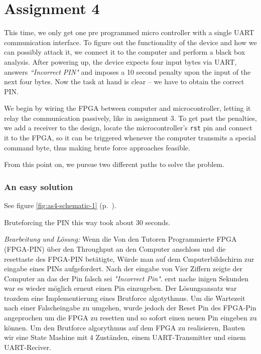 \section*{Assignment 4}


This time, we only get one pre programmed micro controller with a single UART communication interface. 
To figure out the functionality of the device and how we can possibly attack it, we connect it to the computer and perform a black box analysis.
After powering up, the device expects four input bytes via UART, answers \textit{``Incorrect PIN"} and imposes a 10 second penalty upon the input of the next four bytes. Now the task at hand is clear -- we have to obtain the correct PIN.

We begin by wiring the FPGA between computer and microcontroller, letting it relay the communication passively, like in assignment 3.
To get past the penalties, we add a receiver to the design, locate the microcontroller's \texttt{rst} pin and connect it to the FPGA, so it can be triggered whenever the computer transmits a special command byte, thus making brute force approaches feasible.

From this point on, we pursue two different paths to solve the problem.

\subsubsection*{An easy solution}
See figure \ref{fig:as4-schematic-1} (p.~\pageref{fig:as4-schematic-1}).

Bruteforcing the PIN this way took about 30 seconds.



\emph{Bearbeitung und Lösung: }Wenn die Von den Tutoren Programmierte FPGA (FPGA-PIN) über den Throughput an den Computer anschloss und die resettaste des FPGA-PIN betätigte, Würde man auf dem Cmputerbildschirm zur eingabe eines PINs aufgefordert. Nach der eingabe von Vier Ziffern zeigte der Computer an das der Pin falsch sei \emph{"Incorrect Pin"}. erst nache inigen Sekunden war es wieder möglich erneut einen Pin einzugeben. 
Der Lösungsansatz war trozdem eine Implementierung eines Brutforce algotythmus. Um die Wartezeit nach einer Falscheingabe zu umgehen, wurde jedoch der Reset Pin des FPGA-Pin angeprochen um die FPGA zu resetten und so sofort einen neuen Pin eingeben zu können. 
Um den Brutforce algorythmus auf dem FPGA zu realisieren, Bauten wir eine State Mashine mit 4 Zuständen, einem UART-Transmitter und einem UART-Reciver.

